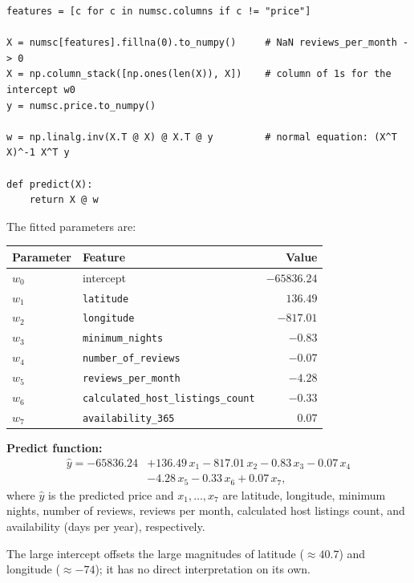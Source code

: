 \documentclass[11pt]{article}
\begin{document}
\begin{lstlisting}
features = [c for c in numsc.columns if c != "price"]

X = numsc[features].fillna(0).to_numpy()     # NaN reviews_per_month -> 0
X = np.column_stack([np.ones(len(X)), X])    # column of 1s for the intercept w0
y = numsc.price.to_numpy()

w = np.linalg.inv(X.T @ X) @ X.T @ y         # normal equation: (X^T X)^-1 X^T y

def predict(X):
    return X @ w
\end{lstlisting}

The fitted parameters are:

\begin{center}
\begin{tabular}{llr}
\toprule
Parameter & Feature & Value \\
\midrule
$w_0$ & intercept                                & $-65836.24$ \\
$w_1$ & \texttt{latitude}                        & $136.49$ \\
$w_2$ & \texttt{longitude}                       & $-817.01$ \\
$w_3$ & \texttt{minimum\_nights}                 & $-0.83$ \\
$w_4$ & \texttt{number\_of\_reviews}             & $-0.07$ \\
$w_5$ & \texttt{reviews\_per\_month}             & $-4.28$ \\
$w_6$ & \texttt{calculated\_host\_listings\_count} & $-0.33$ \\
$w_7$ & \texttt{availability\_365}               & $0.07$ \\
\bottomrule
\end{tabular}
\end{center}

\textbf{Predict function:}
\begin{align*}
  \hat{y} = -65836.24 &+ 136.49\,x_1 - 817.01\,x_2 - 0.83\,x_3 - 0.07\,x_4 \\
                      &- 4.28\,x_5 - 0.33\,x_6 + 0.07\,x_7,
\end{align*}
where $\hat{y}$ is the predicted price and $x_1, \dots, x_7$ are latitude, longitude,
minimum nights, number of reviews, reviews per month, calculated host listings count,
and availability (days per year), respectively.

The large intercept offsets the large magnitudes of latitude ($\approx 40.7$) and
longitude ($\approx -74$); it has no direct interpretation on its own.
\end{document}
